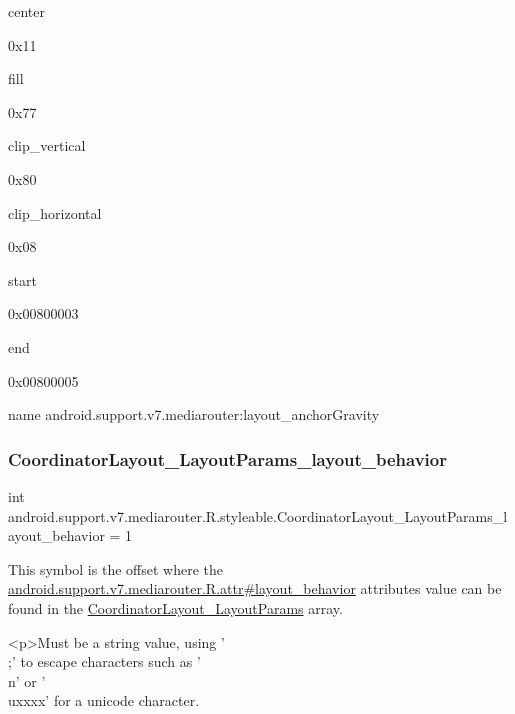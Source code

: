 {\ttfamily center}

0x11

{\ttfamily fill}

0x77

{\ttfamily clip\+\_\+vertical}

0x80

{\ttfamily clip\+\_\+horizontal}

0x08

{\ttfamily start}

0x00800003

{\ttfamily end}

0x00800005

name android.\+support.\+v7.\+mediarouter\+:layout\+\_\+anchor\+Gravity \mbox{\label{classandroid_1_1support_1_1v7_1_1mediarouter_1_1R_1_1styleable_ade4008b88df0372b323afc6e03e8ae46}} 
\subsubsection{\texorpdfstring{Coordinator\+Layout\+\_\+\+Layout\+Params\+\_\+layout\+\_\+behavior}{CoordinatorLayout\_LayoutParams\_layout\_behavior}}
{\footnotesize\ttfamily int android.\+support.\+v7.\+mediarouter.\+R.\+styleable.\+Coordinator\+Layout\+\_\+\+Layout\+Params\+\_\+layout\+\_\+behavior = 1\hspace{0.3cm}{\ttfamily [static]}}

This symbol is the offset where the \hyperlink{classandroid_1_1support_1_1v7_1_1mediarouter_1_1R_1_1attr_af01a26bb13f9e082ad8d1eec85df0fde}{android.\+support.\+v7.\+mediarouter.\+R.\+attr\#layout\+\_\+behavior} attribute\textquotesingle{}s value can be found in the \hyperlink{classandroid_1_1support_1_1v7_1_1mediarouter_1_1R_1_1styleable_a751aa4d9918369b542c5387a38a26624}{Coordinator\+Layout\+\_\+\+Layout\+Params} array.

\begin{DoxyVerb}      <p>Must be a string value, using '\\;' to escape characters such as '\\n' or '\\uxxxx' for a unicode character.
\end{DoxyVerb}
 

